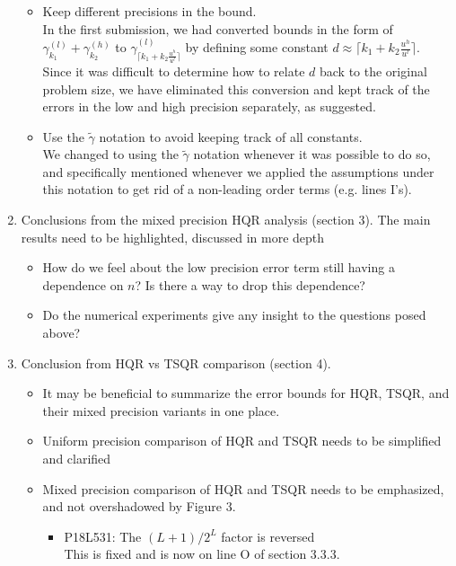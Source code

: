 \documentclass[10pt]{article}
\begin{document}
\begin{enumerate}
\begin{itemize}
{		}
	\item Keep different precisions in the bound.\\
	{\normalfont
		In the first submission, we had converted bounds in the form of $\gamma_{k_1}^{(l)}+\gamma_{k_2}^{(h)}$ to $\gamma_{\lceil k_1+k_2\frac{u^h}{u^l}\rceil}^{(l)}$ by defining some constant $d\approx \lceil k_1+k_2\frac{u^h}{u^l}\rceil$. 
		Since it was difficult to determine how to relate $d$ back to the original problem size, we have eliminated this conversion and kept track of the errors in the low and high precision separately, as suggested. 
	}
	\item Use the $\tilde{\gamma}$ notation to avoid keeping track of all constants.\\
	{\normalfont
	We changed to using the $\tilde{\gamma}$ notation whenever it was possible to do so, and specifically mentioned whenever we applied the assumptions under this notation to get rid of a non-leading order terms (e.g. lines I's).
	}
	\end{itemize}
	
	\item Conclusions from the mixed precision HQR analysis (section 3). 
	The main results need to be highlighted, discussed in more depth
	\begin{itemize}\bfseries
		\item How do we feel about the low precision error term still having a dependence on $n$? Is there a way to drop this dependence?\\
		{\normalfont }
		\item Do the numerical experiments give any insight to the questions posed above?\\
		{\normalfont }
	\end{itemize}
	\item Conclusion from HQR vs TSQR comparison (section 4).
	\begin{itemize}\bfseries
		\item It may be beneficial to summarize the error bounds for HQR, TSQR, and their mixed precision variants in one place. 
		{\normalfont
			
		}
		\item Uniform precision comparison of HQR and TSQR needs to be simplified and clarified \\
		{\normalfont
		}
		\item Mixed precision comparison of HQR and TSQR needs to be emphasized, and not overshadowed by Figure 3. 
		\begin{itemize}\bfseries
			\item P18L531: The $(L+1)/2^L$ factor is reversed \\
			{\normalfont This is fixed and is now on line O of section 3.3.3.}
		\end{itemize}
	\end{itemize}
	

\end{enumerate}
\end{document}
